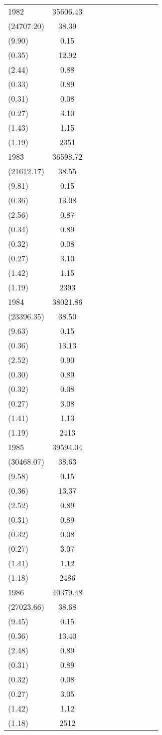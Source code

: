 \begin{table}[htbp]
\begin{tabular}{l*{9}{c}c}
1982 & 35606.43\\(24707.20) & 38.39\\(9.90) & 0.15\\(0.35) & 12.92\\(2.44) & 0.88\\(0.33) & 0.89\\(0.31) & 0.08\\(0.27) & 3.10\\(1.43) & 1.15\\(1.19) & 2351 \\
1983 & 36598.72\\(21612.17) & 38.55\\(9.81) & 0.15\\(0.36) & 13.08\\(2.56) & 0.87\\(0.34) & 0.89\\(0.32) & 0.08\\(0.27) & 3.10\\(1.42) & 1.15\\(1.19) & 2393 \\
1984 & 38021.86\\(23396.35) & 38.50\\(9.63) & 0.15\\(0.36) & 13.13\\(2.52) & 0.90\\(0.30) & 0.89\\(0.32) & 0.08\\(0.27) & 3.08\\(1.41) & 1.13\\(1.19) & 2413 \\
1985 & 39594.04\\(30468.07) & 38.63\\(9.58) & 0.15\\(0.36) & 13.37\\(2.52) & 0.89\\(0.31) & 0.89\\(0.32) & 0.08\\(0.27) & 3.07\\(1.41) & 1.12\\(1.18) & 2486 \\
1986 & 40379.48\\(27023.66) & 38.68\\(9.45) & 0.15\\(0.36) & 13.40\\(2.48) & 0.89\\(0.31) & 0.89\\(0.32) & 0.08\\(0.27) & 3.05\\(1.42) & 1.12\\(1.18) & 2512 \\

\end{tabular}
\end{table}
